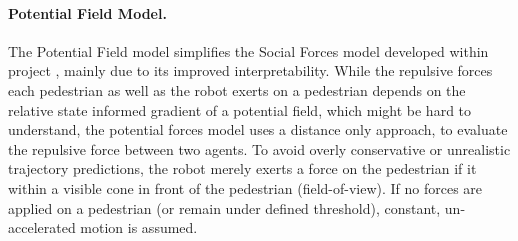 \paragraph{Potential Field Model.} The Potential Field model simplifies the Social Forces model developed within project \project, mainly due to its improved interpretability. While the repulsive forces each pedestrian as well as the robot exerts on a pedestrian depends on the relative state informed gradient of a potential field, which might be hard to understand, the potential forces model uses a distance only approach, to evaluate the repulsive force between two agents. To avoid overly conservative or unrealistic trajectory predictions, the robot merely exerts a force on the pedestrian if it within a visible cone in front of the pedestrian (field-of-view). If no forces are applied on a pedestrian (or remain under defined threshold), constant, un-accelerated motion is assumed.
